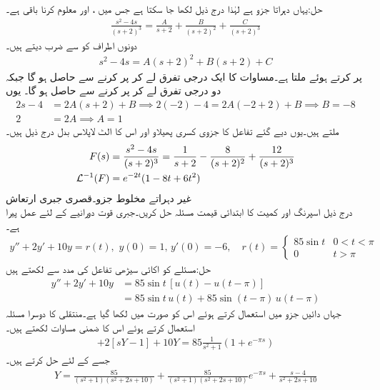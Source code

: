 حل:یہاں  دہراتا جزو ہے لہٰذا درج ذیل لکھا جا سکتا ہے جس میں ،  اور  معلوم کرنا باقی ہے۔
\begin{align*}
\frac{s^2-4s}{(s+2)^3}=\frac{A}{s+2}+\frac{B}{(s+2)^2}+\frac{C}{(s+2)^3}
\end{align*}
دونوں اطراف کو  سے ضرب دیتے ہیں۔
\begin{align*}
s^2-4s=A(s+2)^2+B(s+2)+C
\end{align*}
 پر کرتے ہوئے  ملتا ہے۔مساوات کا ایک درجی تفرق لے کر  پر کرنے سے  حاصل ہو گا جبکہ دو درجی تفرق لے کر  پر کرنے سے  حاصل ہو گا۔ یوں
\begin{align*}
2s-4&=2A(s+2)+B \implies  2(-2)-4=2A(-2+2)+B \implies  B=-8\\
2&=2A\implies  A=1
\end{align*}
ملتے ہیں۔یوں دیے گئے تفاعل کا جزوی کسری پھیلاو  اور اس کا الٹ لاپلاس بدل درج ذیل ہیں۔
\begin{align*}
F(s)&=\frac{s^2-4s}{(s+2)^3}=\frac{1}{s+2}-\frac{8}{(s+2)^2}+\frac{12}{(s+2)^3}\\
\mathcal{L}^{-1}(F)&=e^{-2t}(1-8t+6t^2)
\end{align*}
\quad غیر دہراتے مخلوط جزو۔قصری جبری ارتعاش\\
درج ذیل اسپرنگ اور کمیت کا ابتدائی قیمت مسئلہ حل کریں۔جبری قوت  دورانیے کے لئے عمل پیرا ہے۔
\begin{align*}
y''+2y'+10y=r(t), \,\,y(0)=1, \, y'(0)=-6,\quad r(t)=
\begin{cases}
85\sin t & 0<t<\pi\\
0&t>\pi
\end{cases}
\end{align*}
حل:مسئلے کو اکائی سیڑھی تفاعل کی مدد سے لکھتے ہیں
\begin{align*}
y''+2y'+10y&=85 \sin t\, [u(t)-u(t-\pi)] \\
&=85 \sin t \,u(t)+85\sin(t-\pi)\, u(t-\pi)
\end{align*}
جہاں دائیں جزو میں  استعمال کرتے ہوئے اس کو  صورت میں لکھا گیا ہے۔منتقلی کا دوسرا مسئلہ استعمال کرتے ہوئے اس کا ضمنی مساوات لکھتے ہیں۔
\begin{align*}
[s^2Y-s(1)+6]+2[sY-1]+10Y=85\frac{1}{s^2+1}(1+e^{-\pi s})
\end{align*}
جسے   کے لئے حل کرتے ہیں۔
\begin{align}\label{مساوات_مثال_لاپلاس_نصف_لہر_الف}
Y=\frac{85}{(s^2+1)(s^2+2s+10)}+\frac{85}{(s^2+1)(s^2+2s+10)}e^{-\pi s}+\frac{s-4}{s^2+2s+10}
\end{align}
